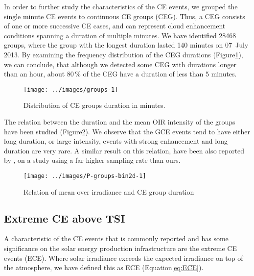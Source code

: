 \documentclass[preprint, 3p,
authoryear]{elsarticle} %
\begin{document}
In order to further study the characteristics of the CE events, we
grouped the single minute CE events to continuous CE groups (CEG). Thus,
a CEG consists of one or more successive CE cases, and can represent
cloud enhancement conditions spanning a duration of multiple minutes. We
have identified 28468 groups, where the group with the longest duration
lasted 140 minutes on 07~July 2013. By examining the frequency
distribution of the CEG durations
(Figure\nobreakspace{}\ref{fig:ceg-duration-distribution}), we can
conclude, that although we detected some CEG with durations longer than
an hour, about \(80\,\%\) of the CEG have a duration of less than 5
minutes.

\begin{figure}

{\centering \texttt{[image: ../images/groups-1]} 

}

\caption{Distribution of CE groups duration in minutes.}\label{fig:ceg-duration-distribution}
\end{figure}

The relation between the duration and the mean OIR intensity of the
groups have been studied (Figure\nobreakspace{}\ref{fig:group-2d}). We
observe that the GCE events tend to have either long duration, or large
intensity, events with strong enhancement and long duration are very
rare. A similar result on this relation, have been also reported by
\citet{Zhang2018}, on a study using a far higher sampling rate than
ours.

\begin{figure}

{\centering \texttt{[image: ../images/P-groups-bin2d-1]} 

}

\caption{Relation of mean over irradiance and CE group duration}\label{fig:group-2d}
\end{figure}

\hypertarget{extreme-ce-above-tsi}{%
\subsection{Extreme CE above TSI}\label{extreme-ce-above-tsi}}

A characteristic of the CE events that is commonly reported and has some
significance on the solar energy production infrastructure are the
extreme CE events (ECE). Where solar irradiance exceeds the expected
irradiance on top of the atmosphere, we have defined this as ECE
(Equation\nobreakspace{}\ref{eq:ECE}).
\end{document}
